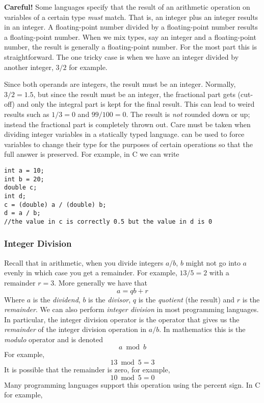 {\color{red} \textbf{Careful!}} Some languages specify that the result of an arithmetic
operation on variables of a certain type \emph{must} match.  That is, an 
integer plus an integer results in an integer.  A floating-point number divided
by a floating-point number results a floating-point number.  When we mix types, 
say an integer and a floating-point number, the result is generally a floating-point
number.  For the most part this is straightforward.  The one tricky case is
when we have an integer divided by another integer, $3 / 2$ for example.  

Since both operands are integers, the result must be an integer.  Normally,
$3 / 2 = 1.5$, but since the result must be an integer, the fractional part
gets  (cut-off) and only the integral part is kept for the final
result.  This can lead to weird results such as $1 / 3 = 0$ and $99 / 100 = 0$.
The result is \emph{not} rounded down or up; instead the fractional part
is completely thrown out.  Care must be taken when dividing integer variables
in a statically typed language.   can be
used to force variables to change their type for the purposes of certain
operations so that the full answer is preserved.  For example, in C we can
write

\begin{verbatim}
int a = 10;
int b = 20;
double c;
int d;
c = (double) a / (double) b;
d = a / b;
//the value in c is correctly 0.5 but the value in d is 0
\end{verbatim}

\subsubsection{Integer Division}

Recall that in arithmetic, when you divide integers $a / b$, $b$ might not
go into $a$ evenly in which case you get a remainder.  For example, $13 / 5 = 2$
with a remainder $r = 3$.  More generally we have that
  $$a = qb + r$$
Where $a$ is the \emph{dividend}, $b$ is the \emph{divisor}, $q$ is
the \emph{quotient} (the result) and $r$ is the \emph{remainder}.  We can
also perform \emph{integer division} in most programming languages.  
In particular, the integer division operator is the operator that gives us the
\emph{remainder} of the integer division operation in $a / b$.  In mathematics
this is the \emph{modulo} operator and is denoted
  $$a \bmod{b}$$
For example, 
  $$13 \bmod{5} = 3$$
It is possible that the remainder is zero, for example,
  $$10 \bmod{5} = 0$$
Many programming languages support this operation using the percent sign.  In
C for example, 

